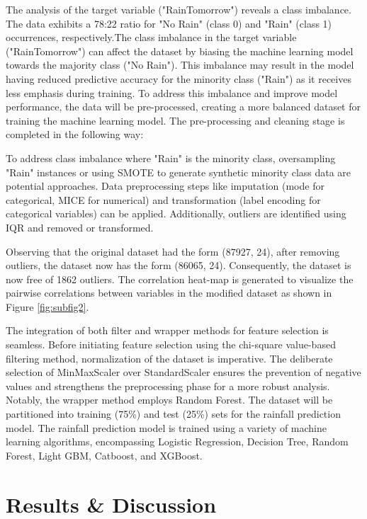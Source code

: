 \documentclass{josis}
\begin{document}
The analysis of the target variable ("RainTomorrow") reveals a class imbalance. The data exhibits a 78:22 ratio for "No Rain" (class 0) and "Rain" (class 1) occurrences, respectively.The class imbalance in the target variable ("RainTomorrow") can affect the dataset by biasing the machine learning model towards the majority class ("No Rain"). This imbalance may result in the model having reduced predictive accuracy for the minority class ("Rain") as it receives less emphasis during training.  To address this imbalance and improve model performance, the data will be pre-processed, creating a more balanced dataset for training the machine learning model.
The pre-processing and cleaning stage is completed in the following way:

To address class imbalance where "Rain" is the minority class, oversampling "Rain" instances or using SMOTE to generate synthetic minority class data are potential approaches. Data preprocessing steps like imputation (mode for categorical, MICE for numerical) and transformation (label encoding for categorical variables) can be applied. Additionally, outliers are identified using IQR and removed or transformed. 

Observing that the original dataset had the form (87927, 24), after removing outliers, the dataset now has the form (86065, 24). Consequently, the dataset is now free of 1862 outliers.
The correlation heat-map is generated to visualize the pairwise correlations between variables in the modified dataset as shown in Figure \ref{fig:subfig2}.


The integration of both filter and wrapper methods for feature selection is seamless. Before initiating feature selection using the chi-square value-based filtering method, normalization of the dataset is imperative. The deliberate selection of MinMaxScaler over StandardScaler ensures the prevention of negative values and strengthens the preprocessing phase for a more robust analysis. Notably, the wrapper method employs Random Forest.
The dataset will be partitioned into training (75\%) and test (25\%) sets for the rainfall prediction model. The rainfall prediction model is trained using a variety of machine learning algorithms, encompassing Logistic Regression, Decision Tree, Random Forest, Light GBM, Catboost, and XGBoost.
\\

\section{Results \& Discussion}
\end{document}
